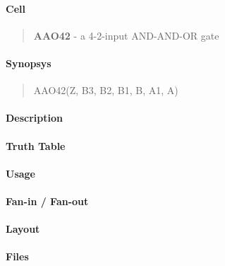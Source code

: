 \label{AAO42}
\paragraph{Cell}
\begin{quote}
    \textbf{AAO42} - a 4-2-input AND-AND-OR gate
\end{quote}

\paragraph{Synopsys}
\begin{quote}
    AAO42(Z, B3, B2, B1, B, A1, A)
\end{quote}

\paragraph{Description}

%

\paragraph{Truth Table}
%

\paragraph{Usage}

\paragraph{Fan-in / Fan-out}

\paragraph{Layout}

\paragraph{Files}
